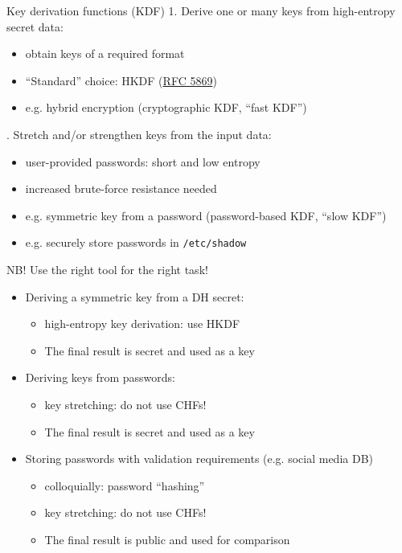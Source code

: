 \begin{frame}{Key derivation functions (KDF)}
  1. Derive one or many keys from high-entropy secret data:
  \begin{itemize}[<+(1)->]
    \item obtain keys of a required format
    \item \enquote{Standard} choice: HKDF (\href{https://datatracker.ietf.org/doc/html/rfc5869}{RFC 5869})
    \item e.g. hybrid encryption (cryptographic KDF, \enquote{fast KDF})
  \end{itemize}

  \vspace*{1em}

  . Stretch and/or strengthen keys from the input data:
  \begin{itemize}[<+(1)->]
    \item user-provided passwords: short and low entropy
    \item increased brute-force resistance needed
    \item e.g. symmetric key from a password (password-based KDF, \enquote{slow KDF})
    \item e.g. securely store passwords in \texttt{/etc/shadow}
  \end{itemize}
\end{frame}

\begin{frame}{NB!}
  Use the right tool for the right task!
  \pause
  \begin{itemize}
    \item Deriving a symmetric key from a DH secret:
    \begin{itemize}
      \item high-entropy key derivation: use HKDF
      \item The final result is secret and used as a key
    \end{itemize}
    \pause
    \item Deriving keys from passwords:
    \begin{itemize}
      \item key stretching: do not use CHFs!
      \item The final result is secret and used as a key
    \end{itemize}
    \pause
    \item Storing passwords with validation requirements (e.g. social media DB)
    \begin{itemize}
      \item colloquially: password \enquote{hashing}
      \item key stretching: do not use CHFs!
      \item The final result is public and used for comparison
    \end{itemize}
  \end{itemize}
\end{frame}

